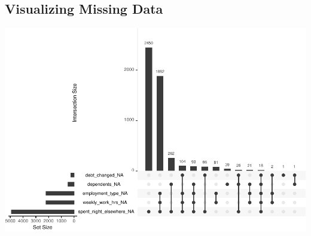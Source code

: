\documentclass[
  10pt,
]{article}
\begin{document}
\hypertarget{visualizing-missing-data}{%
\subsection{Visualizing Missing Data}\label{visualizing-missing-data}}

\begin{center}\includegraphics{final_phase2_report_files/figure-latex/unnamed-chunk-33-1} \end{center}
\end{document}
